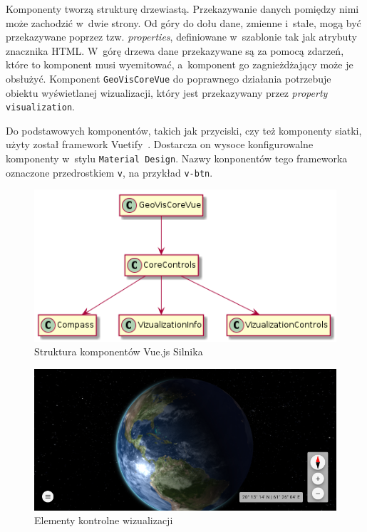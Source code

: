 Komponenty tworzą strukturę drzewiastą. Przekazywanie danych pomiędzy nimi może zachodzić w~dwie strony. Od góry do dołu dane, zmienne i~stałe, mogą być przekazywane poprzez tzw. \textit{properties}, definiowane w~szablonie tak jak atrybuty znacznika HTML. W~górę drzewa dane przekazywane są za pomocą zdarzeń, które to komponent musi wyemitować, a~komponent go zagnieżdżający może je obsłużyć. Komponent \texttt{GeoVisCoreVue} do poprawnego działania potrzebuje obiektu wyświetlanej wizualizacji, który jest przekazywany przez \textit{property} \texttt{visualization}.

Do podstawowych komponentów, takich jak przyciski, czy też komponenty siatki, użyty został framework Vuetify~\cite{Vuetify}. Dostarcza on wysoce konfigurowalne komponenty w~stylu \texttt{Material Design}. Nazwy konponentów tego frameworka oznaczone przedrostkiem \texttt{v}, na przykład \texttt{v-btn}.

\begin{figure}[h]
    \centering
    \includegraphics[scale=0.6]{diagrams/out/c3_vue.png}
    \caption{Struktura komponentów Vue.js Silnika}
    \label{fig:c3_vue}
\end{figure}

\begin{figure}
    \centering
    \includegraphics[width=\linewidth]{img/c3_controls.png}
    \caption{Elementy kontrolne wizualizacji}
    \label{fig:c3_controls}
\end{figure}


